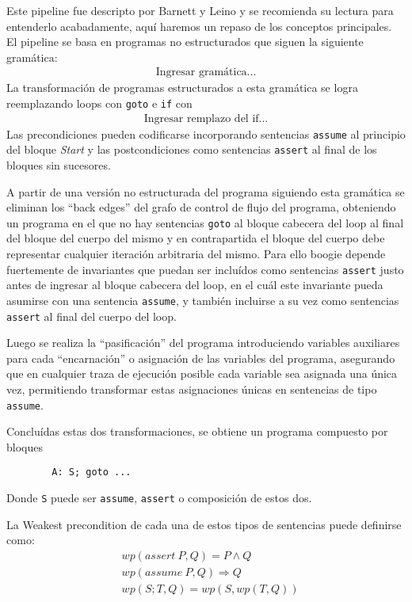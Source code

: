 \documentclass[12pt, a4paper, openany, fleqn]{book}
\begin{document}
    Este pipeline fue descripto por Barnett y Leino\cite{10.1145/1108792.1108813} y se recomienda su lectura para entenderlo acabadamente, aquí haremos un repaso de los conceptos principales.
    El pipeline se basa en programas no estructurados que siguen la siguiente gramática:
    \begin{align*}
        \text{Ingresar gramática...}
    \end{align*}
    La transformación de programas estructurados a esta gramática se logra reemplazando loops con \verb|goto| e \verb|if| con
    \begin{align*}
        \text{Ingresar remplazo del if...}
    \end{align*}
    Las precondiciones pueden codificarse incorporando sentencias \verb|assume| al principio del bloque \textit{Start} y las postcondiciones como sentencias \verb|assert| al final de los bloques sin sucesores.

    A partir de una versión no estructurada del programa siguiendo esta gramática se eliminan los ``back edges'' del grafo de control de flujo del programa, obteniendo un programa en el que no hay sentencias \verb|goto| al bloque cabecera del loop al final del bloque del cuerpo del mismo y en contrapartida el bloque del cuerpo debe representar cualquier iteración arbitraria del mismo. Para ello boogie depende fuertemente de invariantes que puedan ser incluídos como sentencias \verb|assert| justo antes de ingresar al bloque cabecera del loop, en el cuál este invariante pueda asumirse con una sentencia \verb|assume|, y también incluirse a su vez como sentencias \verb|assert| al final del cuerpo del loop.

    Luego se realiza la ``pasificación'' del programa introduciendo variables auxiliares para cada ``encarnación'' o asignación de las variables del programa, asegurando que en cualquier traza de ejecución posible cada variable sea asignada una única vez, permitiendo transformar estas asignaciones únicas en sentencias de tipo \verb|assume|.

    Concluídas estas dos transformaciones, se obtiene un programa compuesto por bloques
    \begin{verbatim}
        A: S; goto ...
    \end{verbatim} 
    Donde \verb|S| puede ser \verb|assume|, \verb|assert| o composición de estos dos.

    La Weakest precondition de cada una de estos tipos de sentencias puede definirse como:
    \begin{align*}
        & wp(assert\ P, Q) = P \land Q \\
        & wp(assume\  P, Q) \Rightarrow Q \\
        & wp(S;T, Q) = wp(S, wp(T,Q)) \\
    \end{align*}
\end{document}
